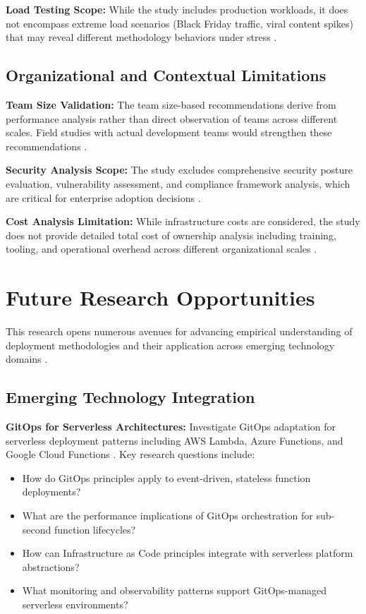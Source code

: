 \textbf{Load Testing Scope:} While the study includes production workloads, it does not encompass extreme load scenarios (Black Friday traffic, viral content spikes) that may reveal different methodology behaviors under stress \cite{stress_testing,extreme_load_scenarios}.

\subsection{Organizational and Contextual Limitations}
\label{subsec:organizational_limitations}

\textbf{Team Size Validation:} The team size-based recommendations derive from performance analysis rather than direct observation of teams across different scales. Field studies with actual development teams would strengthen these recommendations \cite{team_dynamics,organizational_case_studies}.

\textbf{Security Analysis Scope:} The study excludes comprehensive security posture evaluation, vulnerability assessment, and compliance framework analysis, which are critical for enterprise adoption decisions \cite{security_evaluation,compliance_frameworks}.

\textbf{Cost Analysis Limitation:} While infrastructure costs are considered, the study does not provide detailed total cost of ownership analysis including training, tooling, and operational overhead across different organizational scales \cite{tco_analysis,enterprise_cost_modeling}.

\section{Future Research Opportunities}
\label{sec:future_research}

This research opens numerous avenues for advancing empirical understanding of deployment methodologies and their application across emerging technology domains \cite{future_research_directions,emerging_technologies}.

\subsection{Emerging Technology Integration}
\label{subsec:emerging_technology}

\textbf{GitOps for Serverless Architectures:} Investigate GitOps adaptation for serverless deployment patterns including AWS Lambda, Azure Functions, and Google Cloud Functions \cite{serverless_computing,function_as_service}. Key research questions include:
\begin{itemize}
\item How do GitOps principles apply to event-driven, stateless function deployments?
\item What are the performance implications of GitOps orchestration for sub-second function lifecycles?
\item How can Infrastructure as Code principles integrate with serverless platform abstractions?
\item What monitoring and observability patterns support GitOps-managed serverless environments?
\end{itemize}

